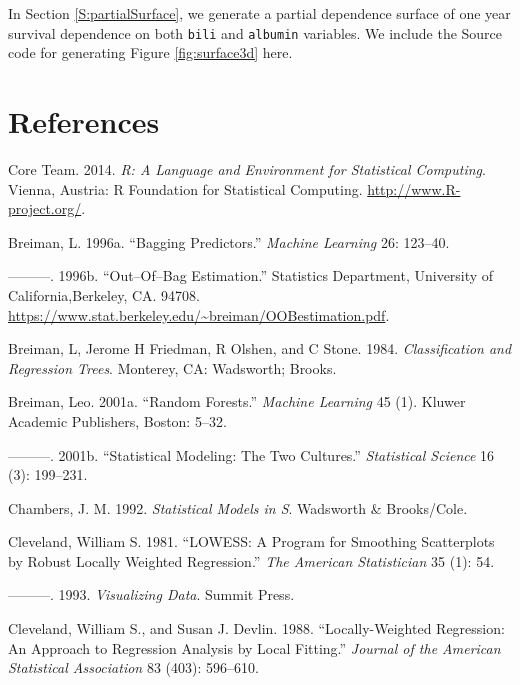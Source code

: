 \documentclass[article, nojss]{jss}
\begin{document}
In Section \ref{S:partialSurface}, we generate a partial dependence
surface of one year survival dependence on both \texttt{bili} and
\texttt{albumin} variables. We include the Source code for generating
Figure \ref{fig:surface3d} here.

\section*{References}\label{references}

\hypertarget{refs}{}
\hypertarget{ref-rcore}{}
 Core Team. 2014. \emph{R: A Language and Environment for
Statistical Computing}. Vienna, Austria: R Foundation for Statistical
Computing. \url{http://www.R-project.org/}.

\hypertarget{ref-Breiman:1996}{}
Breiman, L. 1996a. ``Bagging Predictors.'' \emph{Machine Learning} 26:
123--40.

\hypertarget{ref-BreimanOOB:1996e}{}
---------. 1996b. ``Out--Of--Bag Estimation.'' Statistics Department,
University of California,Berkeley, CA. 94708.
\url{https://www.stat.berkeley.edu/~breiman/OOBestimation.pdf}.

\hypertarget{ref-cart:1984}{}
Breiman, L, Jerome H Friedman, R Olshen, and C Stone. 1984.
\emph{Classification and Regression Trees}. Monterey, CA: Wadsworth;
Brooks.

\hypertarget{ref-Breiman:2001}{}
Breiman, Leo. 2001a. ``Random Forests.'' \emph{Machine Learning} 45 (1).
Kluwer Academic Publishers, Boston: 5--32.

\hypertarget{ref-Breiman:twoCultures:2001}{}
---------. 2001b. ``Statistical Modeling: The Two Cultures.''
\emph{Statistical Science} 16 (3): 199--231.

\hypertarget{ref-chambers:1992}{}
Chambers, J. M. 1992. \emph{Statistical Models in S}. Wadsworth \&
Brooks/Cole.

\hypertarget{ref-cleveland:1981}{}
Cleveland, William S. 1981. ``LOWESS: A Program for Smoothing
Scatterplots by Robust Locally Weighted Regression.'' \emph{The American
Statistician} 35 (1): 54.

\hypertarget{ref-cleveland:1993}{}
---------. 1993. \emph{Visualizing Data}. Summit Press.

\hypertarget{ref-cleveland:1988}{}
Cleveland, William S., and Susan J. Devlin. 1988. ``Locally-Weighted
Regression: An Approach to Regression Analysis by Local Fitting.''
\emph{Journal of the American Statistical Association} 83 (403):
596--610.
\end{document}
